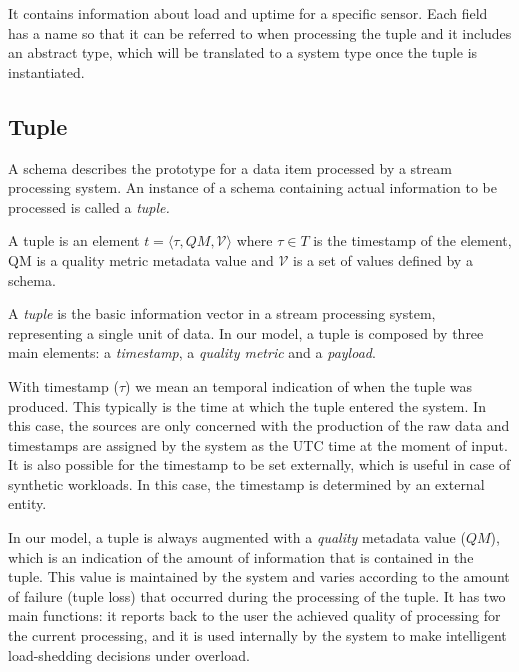 It contains information about load and uptime for a specific sensor. Each field has a name so that
it can be referred to when processing the tuple and it includes an abstract type, which will be
translated to a system type once the tuple is instantiated.\\

\subsection*{Tuple}
A schema describes the prototype for a data item processed by a stream processing system. 
An instance of a schema containing actual information to be processed is called a \emph{tuple.}


\begin{definition}[Tuple]{ 
A tuple is an element $t = \langle \tau, QM, \mathcal{V} \rangle$ where $\tau \in T$ is the
timestamp of the element, QM is a quality metric metadata value and 
$\mathcal{V}$ is a set of values defined by a schema.%
}
\end{definition}

A \textit{tuple} is the basic information vector in a stream processing system, representing a
single unit of data. In our model, a tuple is composed by three main elements: a
\textit{timestamp}, a \textit{quality metric} and a \textit{payload}.

With timestamp ($\tau$) we mean an temporal indication of when the tuple was produced. This typically is
the time at which the tuple entered the system. In this case, the sources are only concerned with the
production of the raw data and timestamps are assigned by the system as the UTC time at the moment of
input. It is also possible for the timestamp to be set externally, which is useful in case
of synthetic workloads. In this case, the timestamp is determined by an external entity.

In our model, a tuple is always augmented with a \emph{quality} metadata value ($QM$), which is an
indication of the amount of information that is contained in the tuple. This value is maintained by the
system and varies according to the amount of failure (\ie tuple loss) that occurred during the
processing of the tuple.
It has two main functions: it reports back to the user the achieved quality of processing for the
current processing, and it is used internally by the system to make intelligent load-shedding decisions
under overload.

